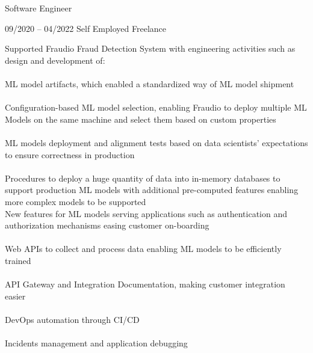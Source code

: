 \documentclass[9pt, green]{template/developercv} %
\begin{document}
{\begin{entrylist}
{		
	}
	{Software Engineer}

	\entry
	{09/2020 -- 04/2022 }
	{}
	{Self Employed \space\cpipe\space Freelance}
	{
		\vspace{0.3mm}
		\begin{minipage}[t]{0.75\textwidth}
			\vspace{-\baselineskip}
			
            Supported Fraudio Fraud Detection System with engineering activities such as design and development of:\\
            \vspace{-3mm}\\
            \itemmarker ML model artifacts, which enabled a standardized way of ML model shipment\\
            \vspace{-3mm}\\
            \itemmarker Configuration-based ML model selection, enabling Fraudio to deploy multiple ML Models on the same machine and select them based on custom properties\\
            \vspace{-3mm}\\
            \itemmarker ML models deployment and alignment tests based on data scientists' expectations to ensure correctness in production\\
            \vspace{-3mm}\\
            \itemmarker Procedures to deploy a huge quantity of data into in-memory databases to support production ML models with additional pre-computed features enabling more complex models to be supported\\
            \itemmarker New features for ML models serving applications such as authentication and authorization mechanisms easing customer on-boarding\\
            \vspace{-3mm}\\
            \itemmarker Web APIs to collect and process data enabling ML models to be efficiently trained\\
            \vspace{-3mm}\\
            \itemmarker API Gateway and Integration Documentation, making customer integration easier\\
            \vspace{-3mm}\\
            \itemmarker DevOps automation through CI/CD\\
            \vspace{-3mm}\\
            \itemmarker Incidents management and application debugging\\
            \vspace{-3mm}\\
            

\end{minipage}}
\end{entrylist}}
\end{document}
